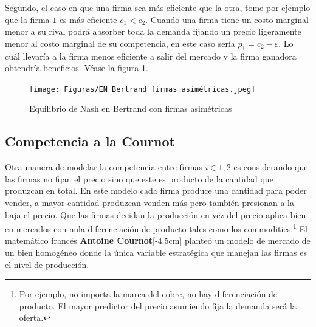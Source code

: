 Segundo, el caso en que una firma sea más eficiente que la otra, tome por ejemplo que la firma $1$ es más eficiente $c_1<c_2$. Cuando una firma tiene un costo marginal menor a su rival podrá absorber toda la demanda fijando un precio ligeramente menor al costo marginal de su competencia, en este caso sería $p_1 = c_2 - \varepsilon$. Lo cuál llevaría a la firma menos eficiente a salir del mercado y la firma ganadora obtendría beneficios. Véase la figura \ref{fig:EN Bertrand asim}. 

\begin{figure}[htb]
    \centering
    \caption{Equilibrio de Nash en Bertrand con firmas asimétricas}
    \centering
    \texttt{[image: Figuras/EN Bertrand firmas asimétricas.jpeg]}
    \label{fig:EN Bertrand asim}
\end{figure}

\subsection{Competencia a la Cournot}

Otra manera de modelar la competencia entre firmas $i \in 1,2$ es considerando que las firmas no fijan el precio sino que este es producto de la cantidad que produzcan en total. En este modelo cada firma produce una cantidad para poder vender, a mayor cantidad produzcan venden más pero también presionan a la baja el precio. Que las firmas decidan la producción en vez del precio aplica bien en mercados con nula diferenciación de producto tales como los commodities.\footnote{Por ejemplo, no importa la marca del cobre, no hay diferenciación de producto. El mayor predictor del precio asumiendo fija la demanda será la oferta.} El matemático francés \textbf{Antoine Cournot}[-4.5cm] planteó un modelo de mercado de un bien homogéneo donde la única variable estratégica que manejan las firmas es el nivel de producción.

